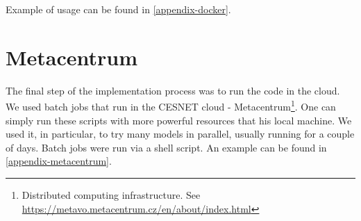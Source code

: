 \noindent
Example of usage can be found in \autoref{appendix-docker}.

\section{Metacentrum}

The final step of the implementation process was to run the code in the cloud. We used batch jobs \cite{metacentrum} that run in the CESNET cloud - Metacentrum\footnote{Distributed computing infrastructure. See \url{https://metavo.metacentrum.cz/en/about/index.html}}. One can simply run these scripts with more powerful resources that his local machine. We used it, in particular, to try many models in parallel, usually running for a couple of days. Batch jobs were run via a shell script. An example can be found in \autoref{appendix-metacentrum}.
